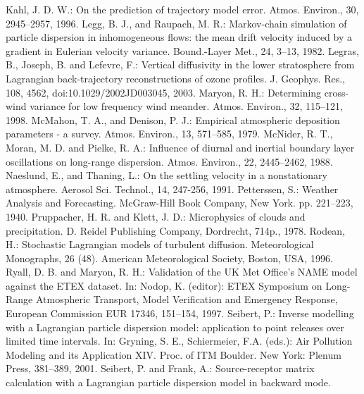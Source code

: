 \documentclass{egu}            %
\begin{document}
\begin{thebibliography}{}
Kahl, J. D. W.:
On the prediction of trajectory model error.
Atmos. Environ., 30, 2945--2957, 1996.
Legg, B. J., and Raupach, M. R.:
Markov-chain simulation of particle dispersion in inhomogeneous flows: the mean drift velocity induced by a gradient in Eulerian velocity variance.
Bound.-Layer Met., 24, 3--13, 1982.
Legras, B., Joseph, B. and Lefevre, F.:
Vertical diffusivity in the lower stratosphere from Lagrangian back-trajectory reconstructions of ozone profiles.
J. Geophys. Res., 108, 4562, doi:10.1029/2002JD003045, 2003.
Maryon, R. H.:
Determining cross-wind variance for low frequency wind meander.
Atmos. Environ., 32, 115--121, 1998.
McMahon, T. A., and Denison, P. J.:
Empirical atmospheric deposition parameters - a survey.
Atmos. Environ., 13, 571--585, 1979.
McNider, R. T., Moran, M. D. and Pielke, R. A.:
Influence of diurnal and inertial boundary layer oscillations on long-range dispersion.
Atmos. Environ., 22, 2445--2462, 1988.
Naeslund, E., and Thaning, L.:
On the settling velocity in a nonstationary atmosphere.
Aerosol Sci. Technol., 14, 247-256, 1991.
Petterssen, S.:
Weather Analysis and Forecasting.
McGraw-Hill Book Company, New York. pp. 221--223, 1940.
Pruppacher, H. R. and Klett, J. D.:
Microphysics of clouds and precipitation.
D. Reidel Publishing Company, Dordrecht, 714p., 1978.
Rodean, H.:
Stochastic Lagrangian models of turbulent diffusion.
Meteorological Monographs, 26 (48). American Meteorological Society, Boston, USA, 1996.
Ryall, D. B. and Maryon, R. H.:
Validation of the UK Met Office's NAME model against the ETEX dataset. In: Nodop, K. (editor): ETEX Symposium on Long-Range Atmospheric Transport, Model Verification and Emergency Response, European Commission EUR 17346, 151--154, 1997.
Seibert, P.:
Inverse modelling with a Lagrangian particle dispersion model:  application to point releases over limited time intervals. In: Gryning, S. E., Schiermeier, F.A.  (eds.): Air Pollution Modeling and its Application XIV. Proc. of ITM Boulder. New York: Plenum Press, 381--389, 2001.
Seibert, P. and Frank, A.:
Source-receptor matrix calculation with a Lagrangian particle dispersion model in backward mode.

\end{thebibliography}
\end{document}
